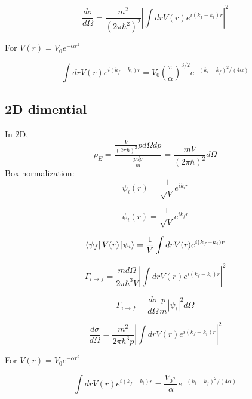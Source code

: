 \documentclass[12pt,twoside]{article}
\begin{document}
$$
\frac{d\sigma}{d\Omega} = \frac{m^2}{(2\pi \hbar^2)^2} |\int dr V(r) e^{i(k_f - k_i) r}|^2
$$

For $V(r) = V_0 e^{-\alpha r^2}$

$$
\int dr V(r) e^{i(k_f - k_i) r} = V_0 (\frac{\pi}{\alpha})^{3/2} e^{-(k_i - k_f)^2/(4\alpha)}
$$


\subsection{2D dimential}

In 2D,
$$
\rho_E = \frac{
\frac{V}{(2\pi\hbar)^2}{ p d\Omega dp}
}{
\frac{p dp}{m}
}
=
\frac{m V}{(2\pi\hbar)^2}{d\Omega}
$$
Box normalization:
$$
\psi_i(r) = \frac{1}{\sqrt{V}} e^{i k_i r}
$$

$$
\psi_i(r) = \frac{1}{\sqrt{V}} e^{i k_f r}
$$

$$
\bra{\psi_f} V(r) \ket{\psi_i} =  \frac{1}{V} \int dr V(r) e^{i(k_f - k_i) r}
$$

$$
\Gamma_{i\rightarrow f} = \frac{m d\Omega}{2\pi \hbar^3 V} |\int dr V(r) e^{i(k_f - k_i) r}|^2
$$

$$
\Gamma_{i\rightarrow f} = \frac{d\sigma}{d\Omega} \frac{p}{m} |\psi_i|^2 d\Omega
$$

$$
\frac{d\sigma}{d\Omega} = \frac{m^2}{2\pi \hbar^3 p} |\int dr V(r) e^{i(k_f - k_i) r}|^2
$$

For $V(r) = V_0 e^{-\alpha r^2}$

$$
\int dr V(r) e^{i(k_f - k_i) r} = \frac{V_0 \pi}{\alpha} e^{-(k_i - k_f)^2/(4\alpha)}
$$
\end{document}
